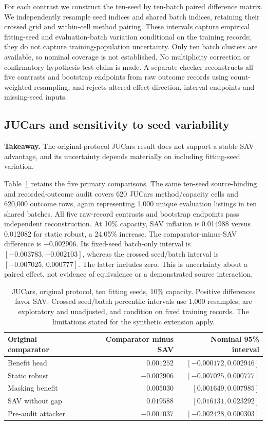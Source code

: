 \documentclass[11pt]{article}
\begin{document}
For each contrast we construct the ten-seed by ten-batch paired difference
matrix. We independently resample seed indices and shared batch indices,
retaining their crossed grid and within-cell method pairing. These intervals
capture empirical fitting-seed and evaluation-batch variation conditional on
the training records; they do not capture training-population uncertainty.
Only ten batch clusters are available, so nominal coverage is not established.
No multiplicity correction or confirmatory hypothesis-test claim is made.
A separate checker reconstructs all five contrasts and bootstrap endpoints
from raw outcome records using count-weighted resampling, and rejects altered
effect direction, interval endpoints and missing-seed inputs.


\subsection{JUCars and sensitivity to seed variability}
\noindent\textbf{Takeaway.} The original-protocol JUCars result does not support
a stable SAV advantage, and its uncertainty depends materially on including
fitting-seed variation.

Table~\ref{tab:original_jucars} retains the five primary comparisons. The same ten-seed source-binding and recorded-outcome audit covers 620 JUCars
method/capacity cells and 620,000 outcome rows, again representing 1,000 unique
evaluation listings in ten shared batches. All five raw-record contrasts and
bootstrap endpoints pass independent reconstruction. At 10\% capacity, SAV
inflation is 0.014988 versus 0.012082 for static robust, a 24.05\% increase.
The comparator-minus-SAV difference is $-0.002906$. Its fixed-seed batch-only
interval is $[-0.003783,-0.002103]$, whereas the crossed seed/batch interval is $[-0.007025,\,0.000777]$. The latter includes zero. This is uncertainty about a
paired effect, not evidence of equivalence or a demonstrated source interaction.

\begin{table}[htbp]
\centering\small
\begin{tabular}{lrr}
\toprule
Original comparator & Comparator minus SAV & Nominal 95\% interval\\
\midrule
Benefit head & $0.001252$ & $[-0.000172,0.002946]$\\
Static robust & $-0.002906$ & $[-0.007025,0.000777]$\\
Masking benefit & $0.005030$ & $[0.001649,0.007985]$\\
SAV without gap & $0.019588$ & $[0.016131,0.023292]$\\
Pre-audit attacker & $-0.001037$ & $[-0.002428,0.000303]$\\
\bottomrule
\end{tabular}
\caption{JUCars, original protocol, ten fitting seeds, 10\% capacity.
Positive differences favor SAV. Crossed seed/batch percentile intervals use
1,000 resamples, are exploratory and unadjusted, and condition on fixed
training records. The limitations stated for the synthetic extension apply.}\label{tab:original_jucars}
\end{table}
\end{document}
